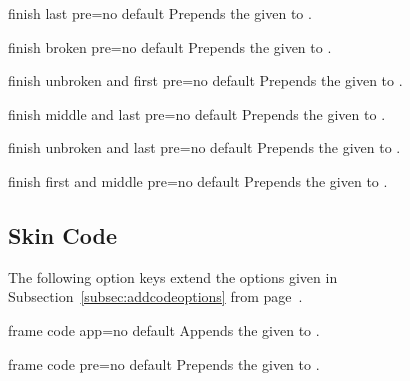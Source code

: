 \begin{docTcbKey}{finish last pre}{=}{no default}
  Prepends the given  to .
\end{docTcbKey}

\begin{docTcbKey}{finish broken pre}{=}{no default}
  Prepends the given  to .
\end{docTcbKey}

\begin{docTcbKey}{finish unbroken and first pre}{=}{no default}
  Prepends the given  to .
\end{docTcbKey}

\begin{docTcbKey}{finish middle and last pre}{=}{no default}
  Prepends the given  to .
\end{docTcbKey}

\begin{docTcbKey}{finish unbroken and last pre}{=}{no default}
  Prepends the given  to .
\end{docTcbKey}

\begin{docTcbKey}[][doc new=2014-09-19]{finish first and middle pre}{=}{no default}
  Prepends the given  to .
\end{docTcbKey}


\subsection{Skin Code}
The following option keys extend the options given in Subsection~\ref{subsec:addcodeoptions}
from page~\pageref{subsec:addcodeoptions}.

\begin{docTcbKey}{frame code app}{=}{no default}
  Appends the given  to .
\end{docTcbKey}

\begin{docTcbKey}{frame code pre}{=}{no default}
  Prepends the given  to .
\end{docTcbKey}

